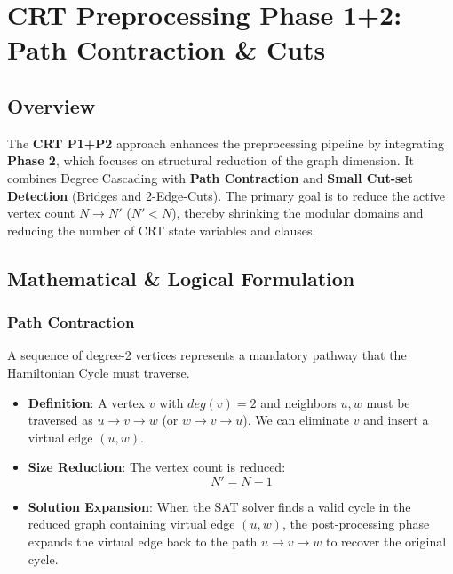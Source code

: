 \section{CRT Preprocessing Phase 1+2: Path Contraction \& Cuts}
\label{sec:crt_p1_p2_contraction}

\subsection{Overview}
The \textbf{CRT P1+P2} approach enhances the preprocessing pipeline by integrating \textbf{Phase 2}, which focuses on structural reduction of the graph dimension.
It combines Degree Cascading with \textbf{Path Contraction} and \textbf{Small Cut-set Detection} (Bridges and 2-Edge-Cuts).
The primary goal is to reduce the active vertex count $N \to N'$ ($N' < N$), thereby shrinking the modular domains and reducing the number of CRT state variables and clauses.

\subsection{Mathematical \& Logical Formulation}

\subsubsection{Path Contraction}
A sequence of degree-2 vertices represents a mandatory pathway that the Hamiltonian Cycle must traverse.
\begin{itemize}
    \item \textbf{Definition}: A vertex $v$ with $deg(v) = 2$ and neighbors $u, w$ must be traversed as $u \to v \to w$ (or $w \to v \to u$).
    We can eliminate $v$ and insert a virtual edge $(u, w)$.
    \item \textbf{Size Reduction}: The vertex count is reduced:
    \begin{equation}
        N' = N - 1
    \end{equation}
    \item \textbf{Solution Expansion}: When the SAT solver finds a valid cycle in the reduced graph containing virtual edge $(u,w)$, the post-processing phase expands the virtual edge back to the path $u \to v \to w$ to recover the original cycle.
\end{itemize}

